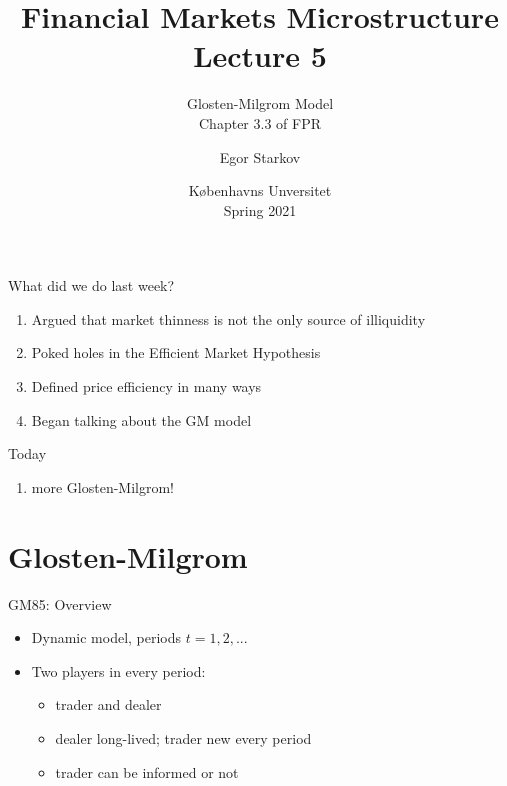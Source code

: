 \documentclass[english,10pt
,aspectratio=169
]{beamer}
\title{Financial Markets Microstructure \\ Lecture 5}
\subtitle{Glosten-Milgrom Model\\
	Chapter 3.3 of FPR}
\author{Egor Starkov}
\date{K{\o}benhavns Unversitet \\
	Spring 2021}
\begin{document}
	\frame[plain]{\titlepage}


\begin{frame}{What did we do last week?}
\begin{enumerate}
	\item Argued that market thinness is not the only source of illiquidity
	\item Poked holes in the Efficient Market Hypothesis
	\item Defined price efficiency in many ways
	\item Began talking about the GM model
\end{enumerate}
\end{frame}


\begin{frame}{Today}
\begin{enumerate}
	\item more Glosten-Milgrom!
\end{enumerate}
\end{frame}


\section{Glosten-Milgrom}

\begin{frame}{GM85: Overview}
	\begin{itemize}
		\item Dynamic model, periods $t = 1,2,...$
		\item Two players in every period:
		\begin{itemize}
			\item trader and dealer
			\item \alert{dealer} long-lived; trader new every period
			\item \alert{trader} can be informed or not
		\end{itemize}
	\end{itemize}
\end{frame}
\end{document}
